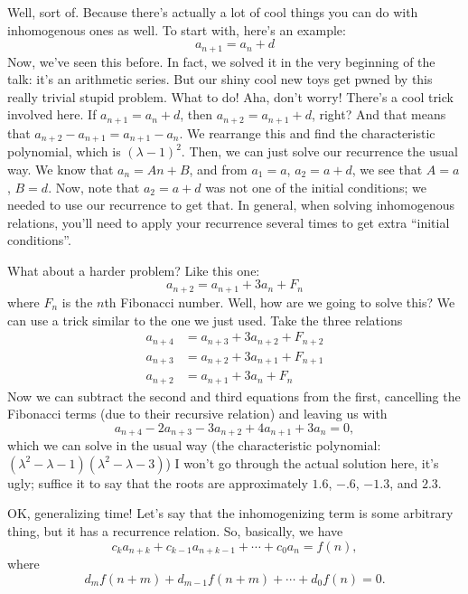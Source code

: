 \documentclass[12pt,letterpaper]{article}
\begin{document}
Well, sort of. Because there's actually a lot of cool things you can do with
inhomogenous ones as well. To start with, here's an example: $$a_{n+1} = a_n + d$$
Now, we've seen this before. In fact, we solved it in the very beginning of the
talk: it's an arithmetic series. But our shiny cool new toys get pwned by this
really trivial stupid problem. What to do! Aha, don't worry! There's a cool
trick involved here. If $a_{n+1} = a_n + d$, then $a_{n+2} = a_{n+1} + d$, right?
And that means that $a_{n+2} - a_{n+1} = a_{n+1} - a_n$. We rearrange this and
find the characteristic polynomial, which is $(\lambda-1)^2$. Then, we can just
solve our recurrence the usual way. We know that $a_n = An + B$, and from
$a_1 = a$, $a_2 = a + d$, we see that $A=a$, $B=d$. Now, note that $a_2 = a + d$
was not one of the initial conditions; we needed to use our recurrence to get
that. In general, when solving inhomogenous relations, you'll need to apply
your recurrence several times to get extra ``initial conditions''.

What about a harder problem? Like this one: $$a_{n+2} = a_{n+1} + 3a_n + F_n$$
where $F_n$ is the $n$th Fibonacci number. Well, how are we going to solve this?
We can use a trick similar to the one we just used. Take the three relations
\begin{align*}
a_{n+4} &= a_{n+3} + 3a_{n+2} + F_{n+2} \\
a_{n+3} &= a_{n+2} + 3a_{n+1} + F_{n+1} \\
a_{n+2} &= a_{n+1} + 3a_n + F_n
\end{align*}
Now we can subtract the second and third equations from the first, cancelling
the Fibonacci terms (due to their recursive relation) and leaving us with
$$a_{n+4} - 2a_{n+3} - 3a_{n+2} + 4a_{n+1} + 3a_n = 0,$$ which we can solve in
the usual way (the characteristic polynomial: $(\lambda^2 - \lambda - 1)(\lambda^2
- \lambda - 3)$) I won't go through the actual solution here, it's ugly; suffice
it to say that the roots are approximately $1.6$, $-.6$, $-1.3$, and $2.3$.

OK, generalizing time! Let's say that the inhomogenizing term is some arbitrary
thing, but it has a recurrence relation. So, basically, we have
$$c_k a_{n+k} + c_{k-1} a_{n+k-1} + \cdots + c_0 a_n = f(n),$$ where
$$d_m f(n+m) + d_{m-1} f(n+m) + \cdots + d_0 f(n) = 0.$$
\end{document}

